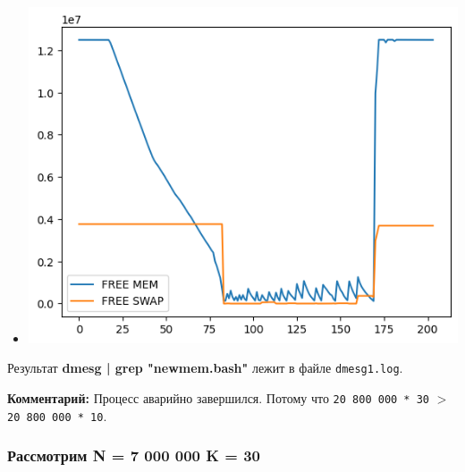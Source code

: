 \documentclass[10pt, a4paper]{article}
\begin{document}
\begin{itemize}
    \item \includegraphics[scale=0.8]{graphs/16.png}
\end{itemize}

Результат \textbf{dmesg | grep "newmem.bash" } лежит в файле \texttt{dmesg1.log}.

\textbf{Комментарий: }
Процесс аварийно завершился. Потому что \texttt{20 800 000 * 30} $>$ \texttt{20 800 000 * 10}.

\subsubsection*{Рассмотрим \textbf{N = 7 000 000} \textbf{K = 30}}
\end{document}
